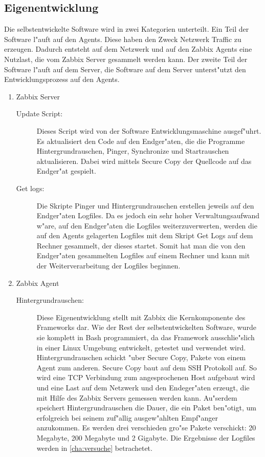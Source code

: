 \subsection{Eigenentwicklung}
Die selbstentwickelte Software wird in zwei Kategorien unterteilt. Ein Teil der Software l"auft %
auf den Agents. Diese haben den Zweck Netzwerk Traffic zu erzeugen. Dadurch entsteht auf dem Netzwerk und %
auf den Zabbix Agents eine Nutzlast, die vom Zabbix Server gesammelt werden kann. Der zweite Teil der Software %
l"auft auf dem Server, die Software auf dem Server unterst"utzt den Entwicklungsprozess auf den Agents. %
\begin{enumerate}
\item Zabbix Server 
\begin{description}
\item[Update Script:]Dieses Script wird von der Software Entwicklungsmaschine ausgef"uhrt. Es aktualisiert den Code auf den Endger"aten, %
die die Programme Hintergrundrauschen, Pinger, Synchronize und Startrauschen aktualisieren. Dabei wird mittels Secure Copy %
der Quellcode auf das Endger"at gespielt.

\item[Get logs:]Die Skripte Pinger und Hintergrundrauschen erstellen jeweils auf den Endger"aten Logfiles. %
Da es jedoch ein sehr hoher Verwaltungsaufwand w"are, auf den Endger"aten die Logfiles weiterzuverwerten, %
werden die auf den Agents gelagerten Logfiles mit dem Skript Get Logs auf dem Rechner gesammelt, der dieses startet. %
Somit hat man die von den Endger"aten gesammelten Logfiles auf einem Rechner und kann %
mit der Weiterverarbeitung der Logfiles beginnen.      

\end{description}

\item Zabbix Agent

\begin{description}
\item[Hintergrundrauschen:]Diese Eigenentwicklung stellt mit Zabbix die Kernkomponente des Frameworks dar. Wie %
der Rest der selbstentwickelten Software, wurde sie komplett in Bash programmiert, da das Framework ausschlie"slich %
in einer Linux Umgebung entwickelt, getestet und verwendet wird. Hintergrundrauschen schickt "uber Secure Copy, %
Pakete von einem Agent zum anderen. Secure Copy baut auf dem SSH Protokoll \autocite{artcl:thorbo} auf. %
So wird eine TCP Verbindung zum angesprochenen Host aufgebaut wird und %
eine Last auf dem Netzwerk und den Endeger"aten erzeugt, die mit Hilfe des Zabbix Servers  %
gemessen werden kann. Au"serdem speichert Hintergrundrauschen die Dauer, die ein Paket ben"otigt, um erfolgreich %
bei seinem zuf"allig ausgew"ahlten Empf"anger anzukommen. Es werden drei verschieden %
gro"se Pakete verschickt: 20 Megabyte, 200 Megabyte und 2 Gigabyte. Die Ergebnisse der Logfiles %
werden in \cref{cha:versuche} betrachetet.


\end{description}
\end{enumerate}
